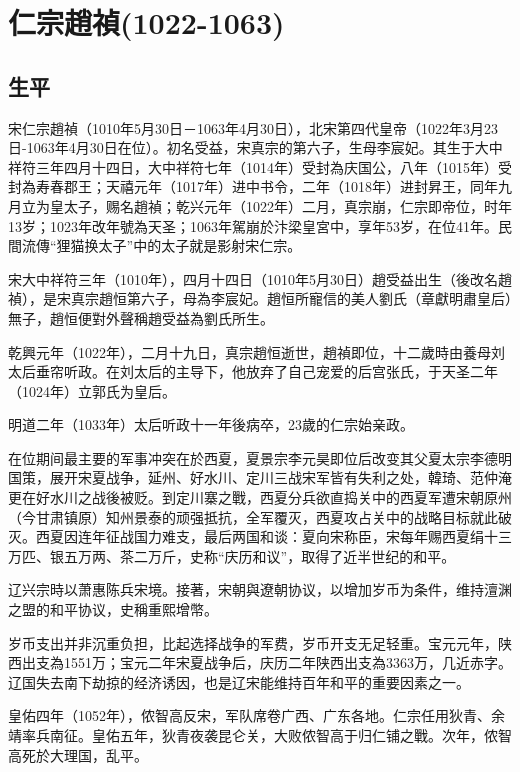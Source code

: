 
\section{仁宗趙禎\tiny(1022-1063)}

\subsection{生平}

宋仁宗趙禎（1010年5月30日－1063年4月30日），北宋第四代皇帝（1022年3月23日-1063年4月30日在位）。初名受益，宋真宗的第六子，生母李宸妃。其生于大中祥符三年四月十四日，大中祥符七年（1014年）受封為庆国公，八年（1015年）受封為寿春郡王；天禧元年（1017年）进中书令，二年（1018年）进封昇王，同年九月立为皇太子，赐名趙禎；乾兴元年（1022年）二月，真宗崩，仁宗即帝位，时年13岁；1023年改年號為天圣；1063年駕崩於汴梁皇宮中，享年53岁，在位41年。民間流傳“狸猫换太子”中的太子就是影射宋仁宗。

宋大中祥符三年（1010年），四月十四日（1010年5月30日）趙受益出生（後改名趙禎），是宋真宗趙恒第六子，母為李宸妃。趙恒所寵信的美人劉氏（章獻明肅皇后）無子，趙恒便對外聲稱趙受益為劉氏所生。

乾興元年（1022年），二月十九日，真宗趙恒逝世，趙禎即位，十二歲時由養母刘太后垂帘听政。在刘太后的主导下，他放弃了自己宠爱的后宫张氏，于天圣二年（1024年）立郭氏为皇后。

明道二年（1033年）太后听政十一年後病卒，23歲的仁宗始亲政。

在位期间最主要的军事冲突在於西夏，夏景宗李元昊即位后改变其父夏太宗李德明国策，展开宋夏战争，延州、好水川、定川三战宋军皆有失利之处，韓琦、范仲淹更在好水川之战後被贬。到定川寨之戰，西夏分兵欲直捣关中的西夏军遭宋朝原州（今甘肃镇原）知州景泰的顽强抵抗，全军覆灭，西夏攻占关中的战略目标就此破灭。西夏因连年征战国力难支，最后两国和谈：夏向宋称臣，宋每年赐西夏绢十三万匹、银五万两、茶二万斤，史称“庆历和议”，取得了近半世纪的和平。

辽兴宗時以萧惠陈兵宋境。接著，宋朝與遼朝协议，以增加岁币为条件，维持澶渊之盟的和平协议，史稱重熙增幣。

岁币支出并非沉重负担，比起选择战争的军费，岁币开支无足轻重。宝元元年，陕西出支為1551万；宝元二年宋夏战争后，庆历二年陕西出支為3363万，几近赤字。辽国失去南下劫掠的经济诱因，也是辽宋能维持百年和平的重要因素之一。

皇佑四年（1052年），侬智高反宋，军队席卷广西、广东各地。仁宗任用狄青、余靖率兵南征。皇佑五年，狄青夜袭昆仑关，大败侬智高于归仁铺之戰。次年，侬智高死於大理国，乱平。

